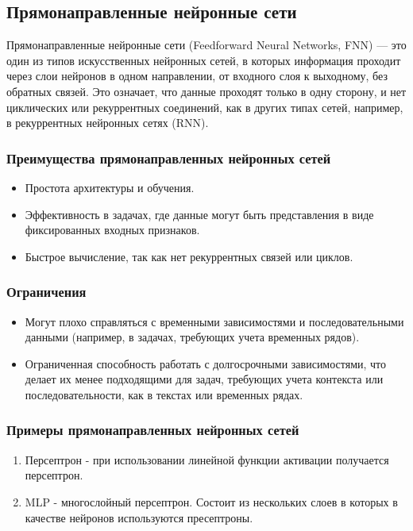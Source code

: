 {\subsection{Прямонаправленные нейронные сети}

Прямонаправленные нейронные сети (Feedforward Neural Networks, FNN) — это один из типов
искусственных нейронных сетей, в которых информация проходит через слои нейронов в одном
направлении, от входного слоя к выходному, без обратных связей. Это означает, что данные проходят
только в одну сторону, и нет циклических или рекуррентных соединений, как в других типах сетей,
например, в рекуррентных нейронных сетях (RNN).
\subsubsection{Преимущества прямонаправленных нейронных сетей}
\begin{itemize}
    \item Простота архитектуры и обучения.
    \item Эффективность в задачах, где данные могут быть представления в виде фиксированных входных признаков.
    \item Быстрое вычисление, так как нет рекуррентных связей или циклов.
\end{itemize}
\subsubsection{Ограничения}
\begin{itemize}
    \item Могут плохо справляться с временными зависимостями и последовательными данными (например, в задачах, требующих учета временных рядов).
    \item Ограниченная способность работать с долгосрочными зависимостями, что делает их менее подходящими для задач, требующих учета контекста или последовательности, как в текстах или временных рядах.
\end{itemize}
\subsubsection{Примеры прямонаправленных нейронных сетей}
\begin{enumerate}
    \item Персептрон - при использовании линейной функции активации получается персептрон.
    \item MLP - многослойный персептрон. Состоит из нескольких слоев в которых в качестве нейронов
          используются пресептроны.
\end{enumerate}
}
